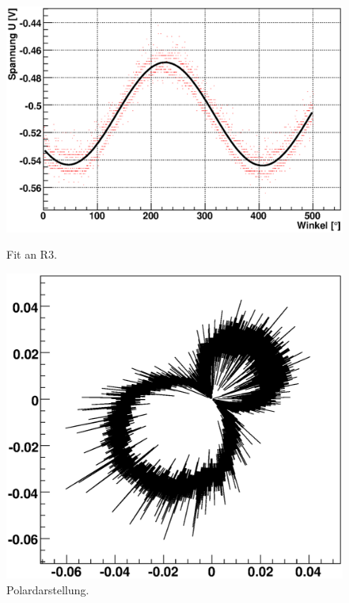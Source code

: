 \documentclass[12pt]{article}
\begin{document}
\begin{figure}[H]  
\begin{minipage}{0.49\linewidth}
\centering
\includegraphics[width=0.9\linewidth]{pictures/R3.eps}
\caption{Fit an R3.}
\end{minipage}
\begin{minipage}{0.5\linewidth}
\centering 
\includegraphics[width=0.9\linewidth]{pictures/R3vd.eps}
\caption{Polardarstellung.}
\end{minipage}
\end{figure}
\end{document}
